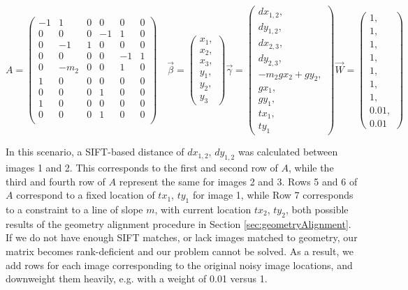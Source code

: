\documentclass[]{spie}  %
\begin{document}
\[
A =
\begin{pmatrix}
  -1 & 1 & 0 & 0 & 0 & 0\\
  0 & 0 & 0 & -1 & 1 & 0\\
  0 & -1 & 1 & 0 & 0 & 0\\
  0 & 0 & 0 & 0 & -1 & 1\\
  0 & -m_2 & 0 & 0 & 1 & 0\\
  1 & 0 & 0 & 0 & 0 & 0\\
  0 & 0 & 0 & 1 & 0 & 0\\
  1 & 0 & 0 & 0 & 0 & 0\\
  0 & 0 & 0 & 1 & 0 & 0\\

\end{pmatrix}\quad
\vec{\beta} =
\begin{pmatrix}
  x_1, \\ x_2, \\ x_3, \\ y_1, \\ y_2, \\ y_3
\end{pmatrix}
\vec{\gamma} =
\begin{pmatrix}
  dx_{1,2}, \\ dy_{1,2}, \\ dx_{2,3}, \\ dy_{2,3}, \\ -m_2gx_2 + gy_2, 
  \\ gx_1, \\ gy_1, \\ tx_1, \\ ty_1
  
\end{pmatrix}
\vec{W} = 
\begin{pmatrix}
  1, \\ 1, \\ 1, \\ 1, \\ 1, \\ 1, \\ 1, \\ 0.01, \\ 0.01
\end{pmatrix}
\]


In this scenario, a SIFT-based distance of $dx_{1,2}$, $dy_{1,2}$ was
calculated between images 1 and 2. This corresponds to the first and
second row of $A$, while the third and fourth row of $A$ represent the
same for images 2 and 3. Rows 5 and 6 of $A$ correspond to a fixed
location of $tx_1$, $ty_1$ for image 1, while Row 7 corresponds to a
constraint to a line of slope $m$, with current location $tx_2$,
$ty_2$, both possible results of the geometry alignment procedure in
Section \ref{sec:geometryAlignment}. If we do not have enough SIFT
matches, or lack images matched to geometry, our matrix becomes
rank-deficient and our problem cannot be solved. As a result, we add
rows for each image corresponding to the original noisy image
locations, and downweight them heavily, e.g. with a weight of 0.01
versus 1.
\end{document}
